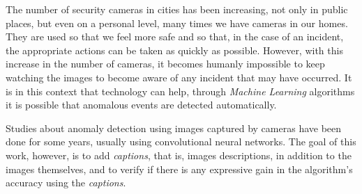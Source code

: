 The number of security cameras in cities has been increasing, not only in public places, but even on a personal level, many times we have cameras in our homes. They are used so that we feel more safe and so that, in the case of an incident, the appropriate actions can be taken as quickly as possible. However, with this increase in the number of cameras, it becomes humanly impossible to keep watching the images to become aware of any incident that may have occurred. It is in this context that technology can help, through \textit{Machine Learning} algorithms it is possible that anomalous events are detected automatically.

Studies about anomaly detection using images captured by cameras have been done for some years, usually using convolutional neural networks. The goal of this work, however, is to add \textit{captions}, that is, images descriptions, in addition to the images themselves, and to verify if there is any expressive gain in the algorithm's accuracy using the \textit{captions}.







